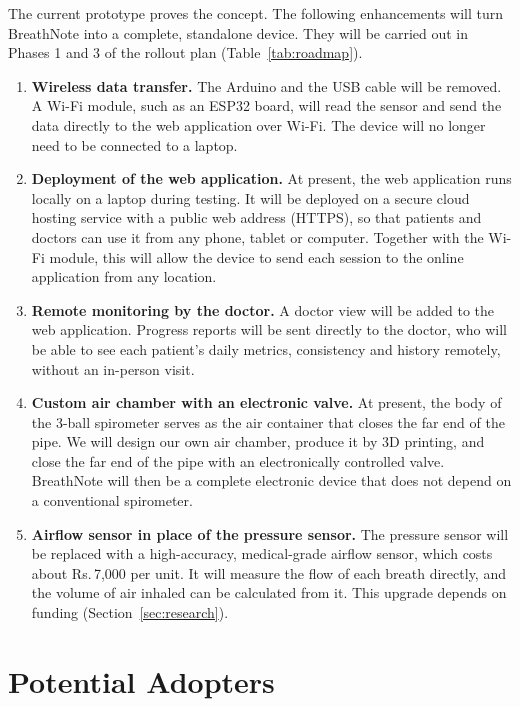 \documentclass[12pt,a4paper]{article}
\newcommand{\rupee}{Rs.\,}              %
\begin{document}
The current prototype proves the concept. The following enhancements will turn BreathNote into a complete, standalone device. They will be carried out in Phases 1 and 3 of the rollout plan (Table~\ref{tab:roadmap}).

\begin{enumerate}
  \item \textbf{Wireless data transfer.} The Arduino and the USB cable will be removed. A Wi-Fi module, such as an ESP32 board, will read the sensor and send the data directly to the web application over Wi-Fi. The device will no longer need to be connected to a laptop.
  \item \textbf{Deployment of the web application.} At present, the web application runs locally on a laptop during testing. It will be deployed on a secure cloud hosting service with a public web address (HTTPS), so that patients and doctors can use it from any phone, tablet or computer. Together with the Wi-Fi module, this will allow the device to send each session to the online application from any location.
  \item \textbf{Remote monitoring by the doctor.} A doctor view will be added to the web application. Progress reports will be sent directly to the doctor, who will be able to see each patient's daily metrics, consistency and history remotely, without an in-person visit.
  \item \textbf{Custom air chamber with an electronic valve.} At present, the body of the 3-ball spirometer serves as the air container that closes the far end of the pipe. We will design our own air chamber, produce it by 3D printing, and close the far end of the pipe with an electronically controlled valve. BreathNote will then be a complete electronic device that does not depend on a conventional spirometer.
  \item \textbf{Airflow sensor in place of the pressure sensor.} The pressure sensor will be replaced with a high-accuracy, medical-grade airflow sensor, which costs about \rupee 7,000 per unit. It will measure the flow of each breath directly, and the volume of air inhaled can be calculated from it. This upgrade depends on funding (Section~\ref{sec:research}).
\end{enumerate}

\section{Potential Adopters}
\end{document}
